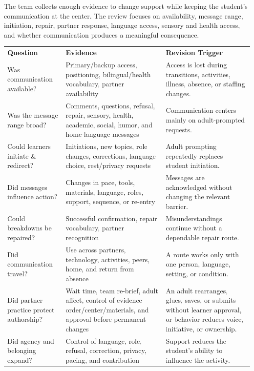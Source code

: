 \documentclass[11pt]{article}
\newcommand{\reviewsection}[1]{%
  \Needspace{4\baselineskip}
  \vspace{0.08in}\noindent{\normalsize\bfseries\color{PrimaryRed}#1}
  \par\vspace{0.025in}
}
\newcommand{\tableheaderthree}[3]{%
  \rowcolor{PrimaryRed}
  \color{white}\bfseries #1 &
  \color{white}\bfseries #2 &
  \color{white}\bfseries #3 \\
}
\begin{document}
\vspace{-0.2cm}
\reviewsection{Data, Review, and Success}
\vspace{-0.2cm}
The team collects enough evidence to change support while keeping the student's communication at the center. The review focuses on availability, message range, initiation, repair, partner response, language access, sensory and health access, and whether communication produces a meaningful consequence.

\vspace{-0.2cm}
\renewcommand{\arraystretch}{1.0}
\setlength{\tabcolsep}{3pt}

\begin{longtable}{>{\RaggedRight\arraybackslash}p{1.25in} >{\RaggedRight\arraybackslash}p{3.00in} >{\RaggedRight\arraybackslash}p{2.80in}}
\tableheaderthree{Question}{Evidence}{Revision Trigger}

Was communication available? &
Primary/backup access, positioning, bilingual/health vocabulary, partner availability &
Access is lost during transitions, activities, illness, absence, or staffing changes. \\

\rowcolor{SoftGray}
Was the message range broad? &
Comments, questions, refusal, repair, sensory, health, academic, social, humor, and home-language messages &
Communication centers mainly on adult-prompted requests. \\

Could learners initiate \& redirect? &
Initiations, new topics, role changes, corrections, language choice, rest/privacy requests &
Adult prompting repeatedly replaces student initiation. \\

\rowcolor{SoftGray}
Did messages influence action? &
Changes in pace, tools, materials, language, roles, support, sequence, or re-entry &
Messages are acknowledged without changing the relevant barrier. \\

Could breakdowns be repaired? &
Successful confirmation, repair vocabulary, partner recognition &
Misunderstandings continue without a dependable repair route. \\

\rowcolor{SoftGray}
Did communication travel? &
Use across partners, technology, activities, peers, home, and return from absence &
A route works only with one person, language, setting, or condition. \\

Did partner practice protect authorship? &
Wait time, team re-brief, adult affect, control of evidence order/center/materials, and approval before permanent changes &
An adult rearranges, glues, saves, or submits without learner approval, or behavior reduces voice, initiative, or ownership. \\

\rowcolor{SoftGray}
Did agency and belonging expand? &
Control of language, role, refusal, correction, privacy, pacing, and contribution &
Support reduces the student's ability to influence the activity. \\

\end{longtable}
\end{document}

